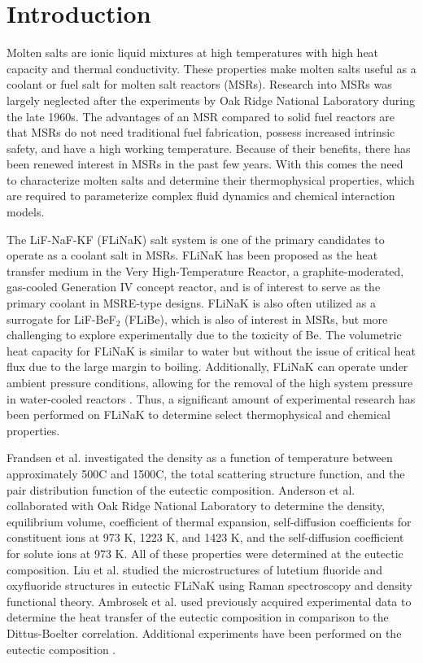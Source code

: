 \documentclass[preprint,12pt]{elsarticle}
\begin{document}
\linenumbers


\section{Introduction}
\label{sec:sample1}


Molten salts are ionic liquid mixtures at high temperatures with high heat capacity and thermal conductivity. These properties make molten salts useful as a coolant or fuel salt for molten salt reactors (MSRs). Research into MSRs was largely neglected after the experiments by Oak Ridge National Laboratory during the late 1960s\cite{Porter2022}. The advantages of an MSR compared to solid fuel reactors are that MSRs do not need traditional fuel fabrication, possess increased intrinsic safety, and have a high working temperature\cite{MSROverview}. Because of their benefits, there has been renewed interest in MSRs in the past few years. With this comes the need to characterize molten salts and determine their thermophysical properties, which are required to parameterize complex fluid dynamics and chemical interaction models\cite{Porter2022,freile2019}.


The LiF-NaF-KF (FLiNaK) salt system is one of the primary candidates to operate as a coolant salt in MSRs. FLiNaK has been proposed as the heat transfer medium in the Very High-Temperature Reactor, a graphite-moderated, gas-cooled Generation IV concept reactor\cite{Benes2009}, and is of interest to serve as the primary coolant in MSRE-type designs. FLiNaK is also often utilized as a surrogate for LiF-BeF$_2$ (FLiBe), which is also of interest in MSRs, but more challenging to explore experimentally due to the toxicity of Be. The volumetric heat capacity for FLiNaK is similar to water but without the issue of critical heat flux due to the large margin to boiling. Additionally, FLiNaK can operate under ambient pressure conditions, allowing for the removal of the high system pressure in water-cooled reactors \cite{Ambrosek2009}. Thus, a significant amount of experimental research has been performed on FLiNaK to determine select thermophysical and chemical properties.  

Frandsen et al. investigated the density as a function of temperature between approximately 500\textdegree C and 1500\textdegree C, the total scattering structure function, and the pair distribution function of the eutectic composition\cite{Frandsen2020}. Anderson et al. collaborated with Oak Ridge National Laboratory to determine the density, equilibrium volume, coefficient of thermal expansion, self-diffusion coefficients for constituent ions at 973 K, 1223 K, and 1423 K, and the self-diffusion coefficient for solute ions at 973 K\cite{Anderson2015}. All of these properties were determined at the eutectic composition. Liu et al. studied the microstructures of lutetium fluoride and oxyfluoride structures in eutectic FLiNaK using Raman spectroscopy and density functional theory\cite{Xiyan2021}. Ambrosek et al. used previously acquired experimental data to determine the heat transfer of the eutectic composition in comparison to the Dittus-Boelter correlation\cite{Ambrosek2009}. Additional experiments have been performed on the eutectic composition \cite{Hoffman1955,Holcomb2010,Yoder2014}.
\end{document}
